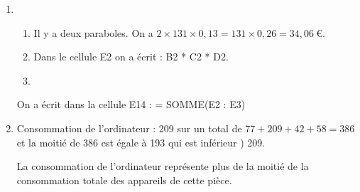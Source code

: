 \begin{enumerate}
\item 
	\begin{enumerate}
		\item %
Il y a deux paraboles. On a $2 \times 131 \times 0,13 = 131 \times 0,26 = 34,06~$\euro. 
		\item %
Dans le cellule E2 on a écrit   :  B2 * C2 * D2.		 
		\item %
	\end{enumerate}
			
\medskip
On a écrit dans la cellule E14 : = SOMME(E2 : E3)
 
\item %

 
Consommation de l'ordinateur : 209 sur un total de $77 + 209 + 42 + 58 = 386$ et la moitié de 386 est égale à 193 qui est inférieur ) 209.

La consommation de l'ordinateur représente plus de la moitié de la consommation totale des appareils de cette pièce. 
\end{enumerate}

\bigskip

